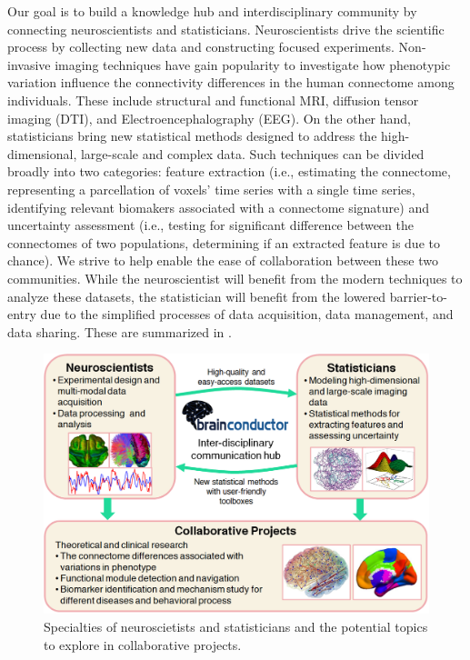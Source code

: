 \documentclass{nature}
\begin{document}
Our goal is to %
build a knowledge hub and interdisciplinary community by connecting
neuroscientists and statisticians.  Neuroscientists
drive the scientific process by collecting new data and constructing focused
experiments. Non-invasive imaging techniques have gain popularity to
investigate how phenotypic variation
influence the connectivity differences in the human
connectome among individuals\cite{sporns2005human,sporns2011human}. These
include structural and functional MRI,
diffusion tensor imaging (DTI), and Electroencephalography
(EEG).
On
the other hand, statisticians bring new statistical methods
designed to address the high-dimensional, large-scale and complex
data. Such techniques can be divided broadly into
two categories:
feature extraction (i.e., estimating the connectome, representing
a parcellation of voxels' time series with a single time series,
identifying relevant biomakers associated with a connectome signature)
and uncertainty assessment (i.e., testing for significant difference
between the connectomes of two populations, determining if 
an extracted feature is due to chance).
We strive to help enable the ease of collaboration between these two
communities.
While the neuroscientist will benefit from the modern techniques to
analyze these datasets, the statistician
will benefit from the lowered barrier-to-entry
due to the  simplified processes of data acquisition, data management, and data
sharing. These are summarized in .

\begin{figure}[tb]
\centering
\includegraphics[width=400pt]{fig/brainconductor/Brainconductor_overview.png}
\caption{Specialties of neuroscietists and statisticians and the potential
topics to explore in collaborative projects.}
\label{fig:overview}
\end{figure}
\end{document}
